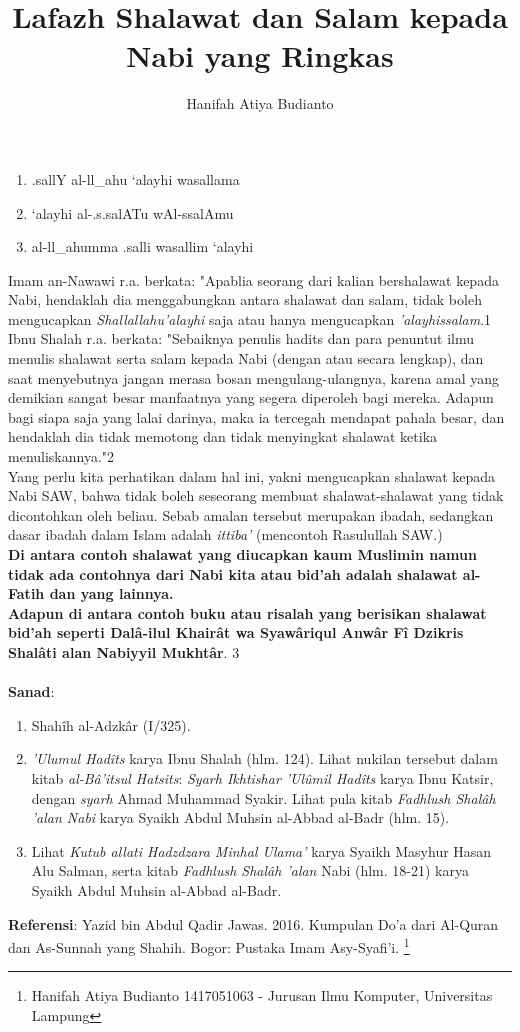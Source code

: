 \documentclass[a4paper,12pt]{article}
\title{\Large Lafazh Shalawat dan Salam kepada Nabi yang Ringkas}
\author{\calligra Hanifah Atiya Budianto}
\begin{document}
\sffamily
\maketitle 
\fullvocalize
{}
\begin{arabtext}
\begin{enumerate}
\item .sallY al-ll_ahu `alayhi wasallama
\item `alayhi al-.s.salATu wAl-ssalAmu
\item al-ll_ahumma .salli wasallim `alayhi
\end{enumerate}
\end{arabtext}
\par
\indent Imam an-Nawawi r.a. berkata: "Apablia seorang dari kalian 
bershalawat kepada Nabi, hendaklah dia menggabungkan antara shalawat dan 
salam, tidak boleh mengucapkan \textit{Shallallahu'alayhi} saja atau hanya 
mengucapkan \textit{'alayhissalam}.{\scriptsize 1}\\
\indent Ibnu Shalah r.a. berkata: "Sebaiknya penulis hadits dan para 
penuntut ilmu menulis shalawat serta salam kepada Nabi (dengan atau secara 
lengkap), dan saat menyebutnya jangan merasa bosan mengulang-ulangnya, 
karena amal yang demikian sangat besar manfaatnya yang segera diperoleh 
bagi mereka. Adapun bagi siapa saja yang lalai darinya, maka ia tercegah 
mendapat pahala besar, dan hendaklah dia tidak memotong dan tidak 
menyingkat shalawat ketika menuliskannya."{\scriptsize 2}\\
\indent Yang perlu kita perhatikan dalam hal ini, yakni mengucapkan 
shalawat kepada Nabi SAW, bahwa tidak boleh seseorang membuat 
shalawat-shalawat yang tidak dicontohkan oleh beliau. Sebab amalan tersebut
merupakan ibadah, sedangkan dasar ibadah dalam Islam adalah 
\textit{ittiba'} (mencontoh Rasulullah SAW.)\\
\indent \textbf{Di antara contoh shalawat yang diucapkan kaum Muslimin 
namun tidak ada contohnya dari Nabi kita atau bid'ah adalah shalawat 
al-Fatih dan yang lainnya.}\\
\indent \textbf{Adapun di antara contoh buku atau risalah yang berisikan 
shalawat bid'ah seperti Dal\^{a}-ilul Khair\^{a}t wa Syaw\^{a}riqul 
Anw\^{a}r F\^{i} Dzikris Shal\^{a}ti alan Nabiyyil Mukht\^{a}r}. 
{\scriptsize 3}\\\\
\noindent
\textbf{Sanad}:
\begin{enumerate}
\item Shah\^{i}h al-Adzk\^{a}r (I/325).
\item \textit{'Ulumul Had\^{i}ts} karya Ibnu Shalah (hlm. 124). Lihat 
nukilan tersebut dalam kitab \textit{al-B\^{a}'itsul Hatsits}: 
\textit{Syarh Ikhtishar 'Ul\^{u}mil Had\^{i}ts} karya Ibnu Katsir, dengan 
\textit{syarh} Ahmad Muhammad Syakir. Lihat pula kitab \textit{Fadhlush 
Shal\^{a}h 'alan Nabi} karya Syaikh Abdul Muhsin al-Abbad al-Badr (hlm. 
15).
\item Lihat \textit{Kutub allati Hadzdzara Minhal Ulama'} karya Syaikh 
Masyhur Hasan Alu Salman, serta kitab \textit{Fadhlush Shal\^{a}h 'alan} 
Nabi (hlm. 18-21) karya Syaikh Abdul Muhsin al-Abbad al-Badr.
\end{enumerate}
\textbf{Referensi}: Yazid bin Abdul Qadir Jawas. 2016. Kumpulan Do'a dari
Al-Quran dan As-Sunnah yang Shahih. Bogor: Pustaka Imam Asy-Syafi'i.
\footnote{Hanifah Atiya Budianto 1417051063 - Jurusan Ilmu Komputer,
Universitas Lampung}
\end{document}
